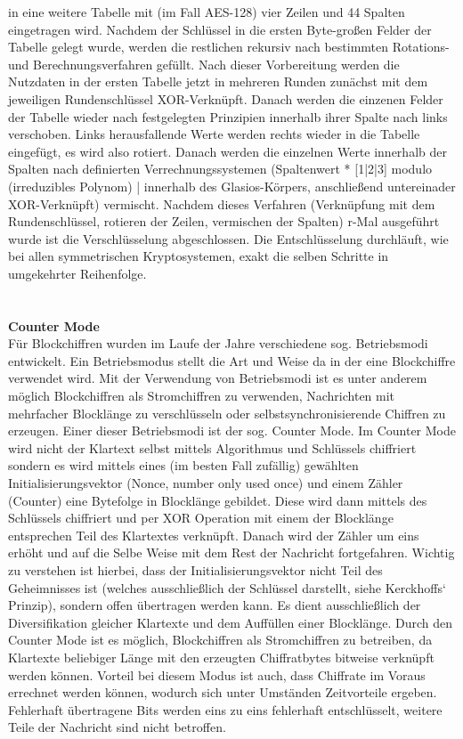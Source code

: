 \documentclass[12pt,a4paper,bibliography=totocnumbered,listof=totocnumbered]{scrartcl}
\begin{document}
in eine weitere Tabelle mit (im Fall AES-128) vier Zeilen und 44 Spalten
eingetragen wird. Nachdem der Schlüssel in die ersten Byte-großen Felder der
Tabelle gelegt wurde, werden die restlichen rekursiv nach bestimmten Rotations-
und Berechnungsverfahren gefüllt. Nach dieser Vorbereitung werden die Nutzdaten
in der ersten Tabelle jetzt in mehreren Runden zunächst mit dem jeweiligen
Rundenschlüssel XOR-Verknüpft. Danach werden die einzenen Felder der Tabelle
wieder nach festgelegten Prinzipien innerhalb ihrer Spalte nach links
verschoben. Links herausfallende Werte werden rechts wieder in die Tabelle
eingefügt, es wird also rotiert. Danach werden die einzelnen Werte innerhalb
der Spalten nach definierten Verrechnungssystemen (Spaltenwert * [1|2|3] modulo
(irreduzibles Polynom) | innerhalb des Glasios-Körpers, anschließend
untereinader XOR-Verknüpft) vermischt. Nachdem dieses Verfahren (Verknüpfung mit
dem Rundenschlüssel, rotieren der Zeilen, vermischen der Spalten) r-Mal
ausgeführt wurde ist die Verschlüsselung abgeschlossen.
Die Entschlüsselung durchläuft, wie bei allen symmetrischen Kryptosystemen,
exakt die selben Schritte in umgekehrter Reihenfolge.
\\\cite{4}\cite{5}\\
\\\textbf{Counter Mode}\\
Für Blockchiffren wurden im Laufe der Jahre verschiedene sog. Betriebsmodi entwickelt. Ein Betriebsmodus stellt die Art und Weise da in der eine Blockchiffre verwendet wird. Mit der Verwendung von Betriebsmodi ist es unter anderem möglich Blockchiffren   als   Stromchiffren   zu   verwenden,   Nachrichten   mit   mehrfacher   Blocklänge   zu   verschlüsseln   oder selbstsynchronisierende Chiffren zu erzeugen. Einer dieser Betriebsmodi ist der sog. Counter Mode.
Im Counter Mode wird nicht der Klartext selbst mittels Algorithmus und Schlüssels chiffriert sondern es wird mittels eines (im besten Fall zufällig) gewählten Initialisierungsvektor (Nonce, number only used once) und einem Zähler (Counter) eine Bytefolge in Blocklänge gebildet. Diese wird dann mittels des Schlüssels chiffriert und per XOR Operation mit einem der Blocklänge entsprechen Teil des Klartextes verknüpft. Danach wird der Zähler um eins erhöht und auf die Selbe Weise mit dem Rest der Nachricht fortgefahren. Wichtig zu verstehen ist hierbei, dass der Initialisierungsvektor nicht Teil des Geheimnisses ist (welches ausschließlich der Schlüssel darstellt, siehe Kerckhoffs‘ Prinzip), sondern offen übertragen werden kann. Es dient ausschließlich der Diversifikation gleicher Klartexte und dem Auffüllen einer Blocklänge. Durch den Counter Mode ist es möglich, Blockchiffren als Stromchiffren zu betreiben, da Klartexte beliebiger Länge mit den erzeugten Chiffratbytes bitweise verknüpft werden können. Vorteil bei diesem Modus ist auch, dass Chiffrate im Voraus errechnet werden können, wodurch sich unter Umständen Zeitvorteile ergeben. Fehlerhaft übertragene Bits werden eins zu eins fehlerhaft entschlüsselt, weitere Teile der Nachricht sind nicht betroffen.
\end{document}
